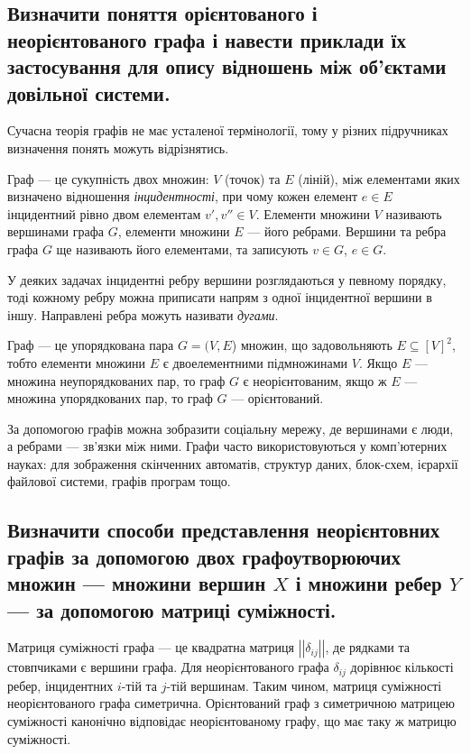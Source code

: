 \documentclass[a4paper,oneside,DIV=9,fontsize=12pt]{scrartcl}
\begin{document}
		\subsection{Визначити поняття орієнтованого і неорієнтованого графа і навести приклади їх застосування для опису відношень між об'єктами довільної системи.}
			Сучасна теорія графів не має усталеної термінології, тому у різних підручниках визначення понять можуть відрізнятись.
			
			Граф --- це сукупність двох множин: $V$ (точок) та $E$ (ліній), між елементами яких визначено відношення \emph{інцидентності}, при чому кожен елемент $e \in E$ інцидентний рівно двом елементам $v', v'' \in V$. Елементи множини $V$ називають вершинами графа $G$, елементи множини $E$ --- його ребрами. Вершини та ребра графа $G$ ще називають його елементами, та записують $v \in G$, $e \in G$.
			
			У деяких задачах інцидентні ребру вершини розглядаються у певному порядку, тоді кожному ребру можна приписати напрям з одної інцидентної вершини в іншу. Направлені ребра можуть називати \emph{дугами}.
			
			Граф --- це упорядкована пара $G = (V, E$) множин, що задовольняють $E \subseteq \left[V\right]^2$, тобто елементи множини $E$ є двоелементними підмножинами $V$. Якщо $E$ --- множина неупорядкованих пар, то граф $G$ є неорієнтованим, якщо ж $E$ --- множина упорядкованих пар, то граф $G$ --- орієнтований.
			
			За допомогою графів можна зобразити соціальну мережу, де вершинами є люди, а ребрами --- зв'язки між ними. Графи часто використовуються у комп'ютерних науках: для зображення скінченних автоматів, структур даних, блок-схем, ієрархії файлової системи, графів програм тощо.
			
		\subsection{Визначити способи представлення неорієнтовних графів за допомогою двох графоутворюючих множин --- множини вершин $X$ і множини ребер $Y$ --- за допомогою матриці суміжності.}
			Матриця суміжності графа --- це квадратна матриця $\left|\left|\delta_{ij}\right|\right|$, де рядками та стовпчиками є вершини графа. Для неорієнтованого графа $\delta_{ij}$ дорівнює кількості ребер, інцидентних $i$-тій та $j$-тій вершинам. Таким чином, матриця суміжності неорієнтованого графа симетрична. Орієнтований граф з симетричною матрицею суміжності канонічно відповідає неорієнтованому графу, що має таку ж матрицю суміжності.
			
\end{document}
